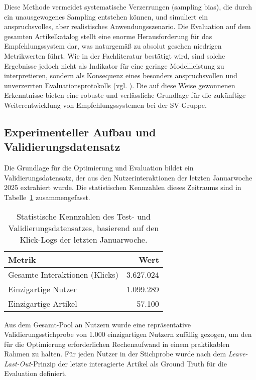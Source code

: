 Diese Methode vermeidet systematische Verzerrungen (sampling bias), die durch ein 
unausgewogenes Sampling entstehen können, und simuliert ein anspruchsvolles, aber realistisches 
Anwendungsszenario. Die Evaluation auf dem gesamten Artikelkatalog stellt eine enorme 
Herausforderung für das Empfehlungssystem dar, was naturgemäß zu absolut gesehen niedrigen 
Metrikwerten führt. Wie in der Fachliteratur bestätigt wird, sind solche Ergebnisse jedoch nicht 
als Indikator für eine geringe Modellleistung zu interpretieren, sondern als Konsequenz eines 
besonders anspruchsvollen und unverzerrten Evaluationsprotokolls 
(vgl. \cite{krichene_sampled_2020}). Die auf diese Weise gewonnenen Erkenntnisse bieten eine 
robuste und verlässliche Grundlage für die zukünftige Weiterentwicklung von 
Empfehlungssystemen bei der SV-Gruppe.

\subsection{Experimenteller Aufbau und Validierungsdatensatz}
Die Grundlage für die Optimierung und Evaluation bildet ein Validierungsdatensatz, der aus den 
Nutzerinteraktionen der letzten Januarwoche 2025 extrahiert wurde. Die statistischen Kennzahlen 
dieses Zeitraums sind in Tabelle~\ref{tab:statistiken_test} zusammengefasst.

\begin{table}[H]
    \centering
    \caption{Statistische Kennzahlen des Test- und Validierungsdatensatzes, basierend auf den Klick-Logs der letzten Januarwoche.}
    \label{tab:statistiken_test}
    \begin{tabular}{lr}
        \toprule
        \textbf{Metrik} & \textbf{Wert} \\
        \midrule
        Gesamte Interaktionen (Klicks) & 3.627.024 \\
        Einzigartige Nutzer & 1.099.289 \\
        Einzigartige Artikel & 57.100 \\
        \bottomrule
    \end{tabular}
\end{table}

Aus dem Gesamt-Pool an Nutzern wurde eine repräsentative Validierungsstichprobe von 1.000 
einzigartigen Nutzern zufällig gezogen, um den für die Optimierung erforderlichen Rechenaufwand in einem praktikablen 
Rahmen zu halten. Für jeden Nutzer in der Stichprobe wurde nach dem \textit{Leave-Last-Out}-Prinzip 
der letzte interagierte Artikel als Ground Truth für die Evaluation definiert.

